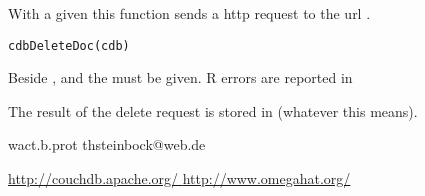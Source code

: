 \begin{Description}\relax
With a given  this function sends a http 
request to the url .
\end{Description}
\begin{Usage}
\begin{verbatim}
cdbDeleteDoc(cdb)
\end{verbatim}
\end{Usage}
\begin{Arguments}
\begin{ldescription}
\item[\code{cdb}] Beside ,  and
 the  must be given. R errors are
reported    in 

\end{ldescription}
\end{Arguments}
\begin{Value}
\begin{ldescription}
\item[\code{cdb }] The result of the delete request is stored in
(whatever this means).

\end{ldescription}
\end{Value}
\begin{Author}\relax
wact.b.prot
thsteinbock@web.de
\end{Author}
\begin{References}\relax
\url{  http://couchdb.apache.org/            }
\url{  http://www.omegahat.org/  }
\end{References}
\begin{SeeAlso}\relax
{}
\end{SeeAlso}

